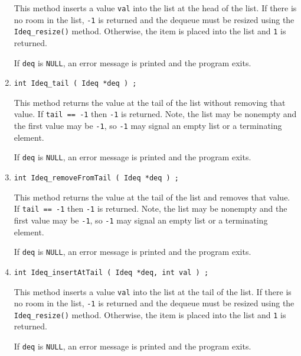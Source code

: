 \begin{enumerate}
\begin{verbatim}
\end{verbatim}
This method inserts a value {\tt val} into the list at the head of
the list.
If there is no room in the list, {\tt -1} is returned and the
dequeue must be resized using the {\tt Ideq\_resize()} method.
Otherwise, the item is placed into the list and {\tt 1} is
returned.
\par {}
If {\tt deq} is {\tt NULL},
an error message is printed and the program exits.
\item
\begin{verbatim}
int Ideq_tail ( Ideq *deq ) ;
\end{verbatim}
This method returns the value at the tail of the list without
removing that value.
If {\tt tail == -1} then {\tt -1} is returned.
Note, the list may be nonempty and the first value may be {\tt -1},
so {\tt -1} may signal an empty list or a terminating element.
\par {}
If {\tt deq} is {\tt NULL},
an error message is printed and the program exits.
\item
\begin{verbatim}
int Ideq_removeFromTail ( Ideq *deq ) ;
\end{verbatim}
This method returns the value at the tail of the list and
removes that value.
If {\tt tail == -1} then {\tt -1} is returned.
Note, the list may be nonempty and the first value may be {\tt -1},
so {\tt -1} may signal an empty list or a terminating element.
\par {}
If {\tt deq} is {\tt NULL},
an error message is printed and the program exits.
\item
\begin{verbatim}
int Ideq_insertAtTail ( Ideq *deq, int val ) ;
\end{verbatim}
This method inserts a value {\tt val} into the list at the tail of
the list.
If there is no room in the list, {\tt -1} is returned and the
dequeue must be resized using the {\tt Ideq\_resize()} method.
Otherwise, the item is placed into the list and {\tt 1} is
returned.
\par {}
If {\tt deq} is {\tt NULL},
an error message is printed and the program exits.
\end{enumerate}
\par
